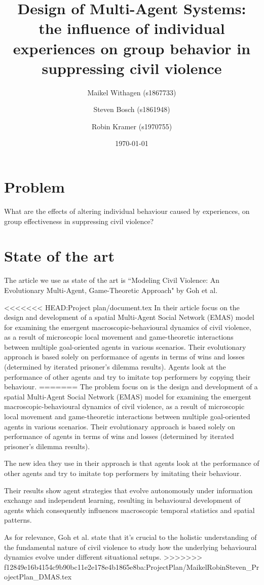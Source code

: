 \documentclass[11pt,a4paper]{article}
\title{Design of Multi-Agent Systems: the influence of individual experiences on group behavior in suppressing civil violence}
\author{Maikel Withagen (s1867733) \and Steven Bosch (s1861948) \and Robin Kramer (s1970755)}
\date{\today}
\begin{document}
	\maketitle
	
	\section{Problem}
		What are the effects of altering individual behaviour caused by experiences, on group effectiveness in suppressing civil violence?
		
	\section{State of the art}
		The article we use as state of the art is ``Modeling Civil Violence: An Evolutionary Multi-Agent, Game-Theoretic Approach" by Goh et al.
		
<<<<<<< HEAD:Project plan/document.tex
		In their article \citet{Goh} focus on the design and development of a spatial Multi-Agent Social Network (EMAS) model for examining the emergent macroscopic-behavioural dynamics of civil violence, as a result of microscopic local movement and game-theoretic interactions between multiple goal-oriented agents in various scenarios. Their evolutionary approach is based solely on performance of agents in terms of wins and losses (determined by iterated prisoner's dilemma results). Agents look at the performance of other agents and try to imitate top performers by copying their behaviour. 
=======
		The problem \citet{Goh} focus on is the design and development of a spatial Multi-Agent Social Network (EMAS) model for examining the emergent macroscopic-behavioural dynamics of civil violence, as a result of microscopic local movement and game-theoretic interactions between multiple goal-oriented agents in various scenarios. Their evolutionary approach is based solely on performance of agents in terms of wins and losses (determined by iterated prisoner's dilemma results). 
		
		The new idea they use in their approach is that agents look at the performance of other agents and try to imitate top performers by imitating their behaviour. 
		
		Their results show agent strategies that evolve autonomously under information exchange and independent learning, resulting in behavioural development of agents which consequently influences macroscopic temporal statistics and spatial patterns.
		
		As for relevance, Goh et al. state that it's crucial to the holistic understanding of the fundamental nature of civil violence to study how the underlying behavioural dynamics evolve under different situational setups.
>>>>>>> f12849e16b4154c9b90bc11e2e178e4b1865e8ba:ProjectPlan/MaikelRobinSteven_ProjectPlan_DMAS.tex
		
\end{document}
